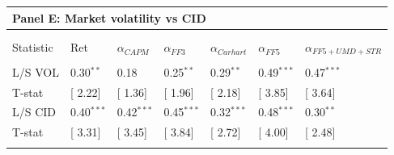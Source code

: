 \documentclass[12pt]{article}
\begin{document}
\begin{table}[!htbp]
\begin{tabularx}{\linewidth}{p{2cm}p{1.5cm}p{1.5cm}p{1.5cm}p{1.5cm}p{1.5cm}p{1.5cm}}
    \toprule
    \multicolumn{7}{l}{\textbf{Panel E: Market volatility vs CID}} \\
    \midrule 
\\[-1.8ex]\hline 
\hline \\[-1.8ex] 
Statistic & Ret & $\alpha_{CAPM}$ & $\alpha_{FF3}$ & $\alpha_{Carhart}$ & $\alpha_{FF5}$ & $\alpha_{FF5+UMD+STR}$ \\ 
\hline \\[-1.8ex] 
L/S VOL & 0.30$^{**}$ & 0.18 & 0.25$^{**}$ & 0.29$^{**}$ & 0.49$^{***}$ & 0.47$^{***}$ \\ 
T-stat & [ 2.22] & [ 1.36] & [ 1.96] & [ 2.18] & [ 3.85] & [ 3.64] \\ 
L/S CID & 0.40$^{***}$ & 0.42$^{***}$ & 0.45$^{***}$ & 0.32$^{***}$ & 0.48$^{***}$ & 0.30$^{**}$ \\ 
T-stat & [ 3.31] & [ 3.45] & [ 3.84] & [ 2.72] & [ 4.00] & [ 2.48] \\ 
\hline \\[-1.8ex] 
\end{tabularx} 
\end{table} 
\end{document}

